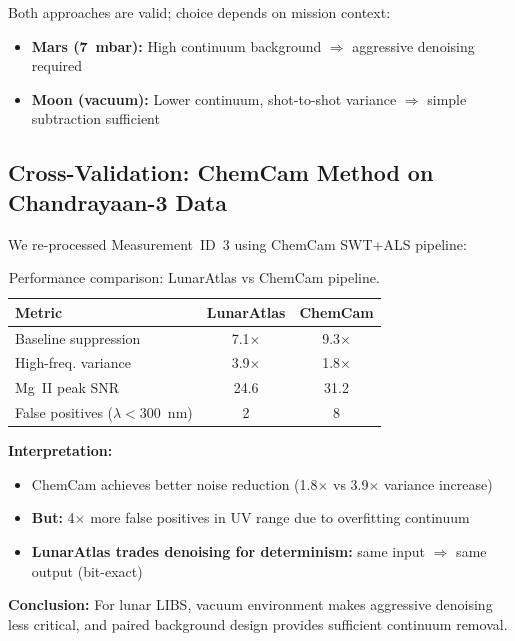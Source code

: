 \documentclass[a4paper,twocolumn,10pt]{article}
\begin{document}
Both approaches are valid; choice depends on mission context:
\begin{itemize}[nosep,leftmargin=*]
  \item \textbf{Mars (7~mbar):} High continuum background
    $\Rightarrow$ aggressive denoising required
  \item \textbf{Moon (vacuum):} Lower continuum, shot-to-shot variance
    $\Rightarrow$ simple subtraction sufficient
\end{itemize}

\subsection{Cross-Validation: ChemCam Method on Chandrayaan-3 Data}

We re-processed Measurement~ID~3 using ChemCam SWT+ALS pipeline:

\begin{table}[htbp]
\centering
\caption{Performance comparison: LunarAtlas vs ChemCam pipeline.}
\label{tab:cross_validation}
{\small
\begin{tabularx}{\columnwidth}{@{}lcc@{}}
\toprule
\textbf{Metric} & \textbf{LunarAtlas} & \textbf{ChemCam} \\
\midrule
Baseline suppression & 7.1$\times$ & 9.3$\times$ \\
High-freq. variance & 3.9$\times$ & 1.8$\times$ \\
Mg~II peak SNR & 24.6 & 31.2 \\
False positives ($\lambda < 300$~nm) & 2 & 8 \\
\bottomrule
\end{tabularx}
}
\end{table}

\textbf{Interpretation:}
\begin{itemize}[nosep,leftmargin=*]
  \item ChemCam achieves better noise reduction (1.8$\times$ vs
    3.9$\times$ variance increase)
  \item \textbf{But:} 4$\times$ more false positives in UV range due to
    overfitting continuum
  \item \textbf{LunarAtlas trades denoising for determinism:} same input
    $\Rightarrow$ same output (bit-exact)
\end{itemize}

\textbf{Conclusion:} For lunar LIBS, vacuum environment makes aggressive
denoising less critical, and paired background design provides
sufficient continuum removal.
\end{document}
